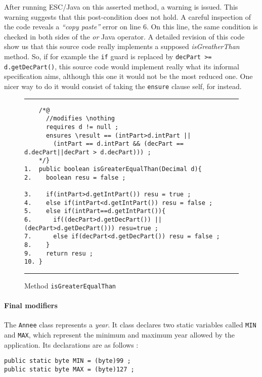 \documentclass[a4paper]{llncs}
\begin{document}
After running ESC/Java on this asserted method, a warning is
issued. This warning suggests that this post-condition
does not hold. A careful inspection of the code reveals a
\emph{``copy paste''} error on line $6$. On this
line, the same
condition is checked in both sides of the \emph{or} Java operator. A
detailed revision of this code show us that this source code really
implements a supposed \emph{isGreatherThan} method. So, if for example 
the \texttt{if} guard is replaced by \texttt{decPart >= d.getDecPart()}, this source
code would implement really what its informal specification aims,
although this one it would not be the most reduced one. One nicer
way to do it would consist of taking the \texttt{ensure} clause self,
for instead.
\begin{figure}[hbt]
\rule{\linewidth}{0.3mm}
\begin{verbatim}
    /*@
      //modifies \nothing
      requires d != null ;
      ensures \result == (intPart>d.intPart ||
        (intPart == d.intPart && (decPart == d.decPart||decPart > d.decPart))) ;
    */}
1.  public boolean isGreaterEqualThan(Decimal d){
2.    boolean resu = false ;

3.    if(intPart>d.getIntPart()) resu = true ;
4.    else if(intPart<d.getIntPart()) resu = false ;
5.    else if(intPart==d.getIntPart()){
6.      if((decPart>d.getDecPart()) || (decPart>d.getDecPart())) resu=true ;
7.      else if(decPart<d.getDecPart()) resu = false ;
8.    }
9.    return resu ;
10. }
\end{verbatim}
\caption{Method {\tt isGreaterEqualThan}}
\label{fig-cla-dec}
\rule{\linewidth}{0.3mm}
\end{figure}






\paragraph{Final modifiers}

The \texttt{Annee} class represents a \textit{year}. It class
declares two
static variables called \texttt{MIN} and \texttt{MAX}, which represent
the minimum and maximum year allowed by the application.
Its declarations are as follows $:$
\begin{verbatim}
public static byte MIN = (byte)99 ;
public static byte MAX = (byte)127 ;
\end{verbatim}
\end{document}
